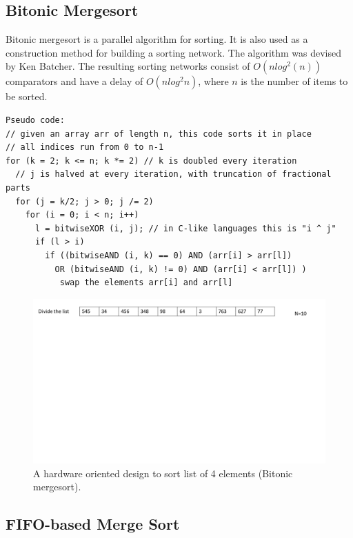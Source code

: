 \documentclass{article}
\begin{document}
\subsection{Bitonic Mergesort}
\label{subsec:Bitonic Mergesort}


Bitonic mergesort is a parallel algorithm for sorting\cite{wiki:002}. It is also used as a construction method for building a sorting network. The algorithm was devised by Ken Batcher. The resulting sorting networks consist of  $O(nlog^2(n))$ comparators and have a delay of $O(nlog^2n)$, where $n$ is the number of items to be sorted.

\begin{lstlisting}
Pseudo code:
// given an array arr of length n, this code sorts it in place
// all indices run from 0 to n-1
for (k = 2; k <= n; k *= 2) // k is doubled every iteration
  // j is halved at every iteration, with truncation of fractional parts
  for (j = k/2; j > 0; j /= 2) 
    for (i = 0; i < n; i++)
      l = bitwiseXOR (i, j); // in C-like languages this is "i ^ j"
      if (l > i)
        if ((bitwiseAND (i, k) == 0) AND (arr[i] > arr[l])
          OR (bitwiseAND (i, k) != 0) AND (arr[i] < arr[l]) )
           swap the elements arr[i] and arr[l]
\end{lstlisting}

\begin{figure}[H]
\centering
\includegraphics[width=1.00\textwidth]{bitonic_nwk.PNG}
\caption{\label{fig:bitonic_nwk}A hardware oriented design to sort list of 4 elements (Bitonic mergesort).}
\end{figure}

\subsection{FIFO-based Merge Sort}
\label{subsec:FIFO-based Merge Sort}
\end{document}

